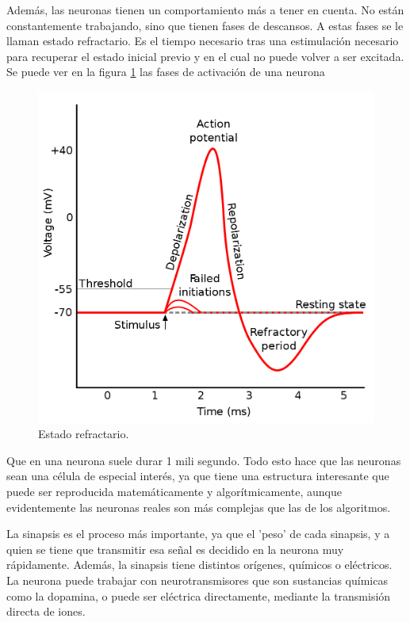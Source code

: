 \documentclass[12pt]{article}
\numberwithin{equation}{section}
\begin{document}
Además, las neuronas tienen un comportamiento más a tener en cuenta. No están constantemente trabajando, sino que tienen fases de descansos. A estas fases se le llaman estado refractario. Es el tiempo necesario tras una estimulación necesario para recuperar el estado inicial previo y en el cual no puede volver a ser excitada. Se puede ver en la figura \ref{fig:refractario} las fases de activación de una neurona
\begin{figure}[h]
    \centering
    \includegraphics[scale=0.2]{refractorystate.png}
    \caption{Estado refractario.}
    \label{fig:refractario}
\end{figure}

Que en una neurona suele durar 1 mili segundo. Todo esto hace que las neuronas sean una célula de especial interés, ya que tiene una estructura interesante que puede ser reproducida matemáticamente y algorítmicamente, aunque evidentemente las neuronas reales son más complejas que las de los algoritmos.

La sinapsis es el proceso más importante, ya que el 'peso' de cada sinapsis, y a quien se tiene que transmitir esa señal es decidido en la neurona muy rápidamente. Además, la sinapsis tiene distintos orígenes, químicos o eléctricos. La neurona puede trabajar con neurotransmisores que son sustancias químicas como la dopamina, o puede ser eléctrica directamente, mediante la transmisión directa de iones.	
\end{document}
